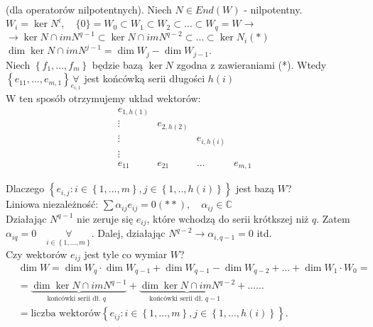 \documentclass[../main.tex]{subfiles}
\begin{document}
\begin{dowod}
    (dla operatorów nilpotentnych). Niech $N\in End(W)$ - nilpotentny.\\
    $W_i = \ker N^i,\quad \{0\} = W_0 \subset W_1 \subset W_2 \subset \ldots \subset W_q = W \to$\\
    $\to \ker N \cap im N^{q-1} \subset \ker N \cap im N^{q-2} \subset \ldots \subset \ker N_i (*)$\\
    $\dim \ker N \cap im N^{j-1} = \dim W_j - \dim W_{j-1}$.\\
    Niech $\left\{ f_1,\ldots,f_m \right\} $ będzie bazą $\ker N$ zgodna z zawieraniami (*). Wtedy $\left\{ e_{11},\ldots,e_{m,1} \right\} \underset{e_{i,1}}{\forall} $ jest końcówką serii długości $h(i)$\\

    W ten sposób otrzymujemy układ wektorów:
    \[
        \begin{matrix}
            e_{1,h(1)}&&&\\
                      \vdots&e_{2,h(2)}&&\\
                      \vdots&&e_{i,h(i)}&\\
            \vdots&&&\\
                  e_{11}&e_{21}&\ldots&e_{m,1}
        \end{matrix}
    \]
\end{dowod}
Dlaczego $\left\{ e_{i,j}: i\in \left\{ 1,\ldots,m \right\} , j\in \left\{ 1,..,h(i) \right\}  \right\} $ jest bazą $W$?\\
Liniowa niezależność: $\sum \alpha_{ij} e_{ij} = 0 (**), \quad \alpha_{ij}\in \mathbb{C}$ \\
Działając $N^{q-1}$ nie zeruje się $e_{ij}$, które wchodzą do serii krótkszej niż $q$. Zatem $\alpha_{iq} = 0\quad \underset{i\in\left\{ 1,\ldots,m \right\} }{\forall} $. Dalej, działając $N^{q-2} \to \alpha_{i,q-1} = 0$ itd.\\
Czy wektorów $e_{ij}$ jest tyle co wymiar $W$?
\begin{align*}
    &\dim W = \dim W_q \cdot  \dim W_{q-1} + \dim W_{q-1} - \dim W_{q-2} + \ldots + \dim W_1 \cdot W_{0} = \\
    &= \underbrace{\dim \ker N \cap im N^{q-1}}_{\text{końcówki serii dł. $q$ }} + \underbrace{\dim \ker N \cap im N^{q-2}}_{\text{końcówki serii dł. $q-1$ }} + \ldots \ldots\\
    &= \text{liczba wektorów} \left\{ e_{ij}: i\in \left\{ 1,\ldots,m \right\} , j\in \left\{ 1,\ldots,h(i) \right\}  \right\}
.\end{align*}
\end{document}
